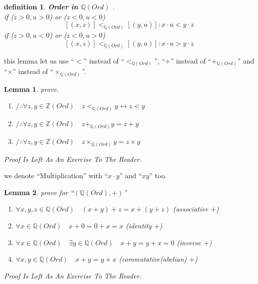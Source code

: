 \documentclass[10pt,a4paper]{book}
\newtheorem{definition}{definition}[section]
\newtheorem{lemma}{Lemma}[section]
\begin{document}
\begin{definition}\textbf{Order in $\mathbb{Q} (Ord)$} .\\
    if ($z > 0 , u > 0$) or ($z < 0 , u < 0$)
    \[ [(x  , z)] <_{\mathbb{Q} (Ord)} [(y  , u)]  : x  \cdot u  < y  \cdot z \]
    if ($z > 0 , u < 0$) or ($z < 0 , u > 0$)
    \[ [(x  , z)] <_{\mathbb{Q} (Ord)} [(y  , u)]  : x  \cdot u  > y  \cdot z \]
\end{definition}

this lemma let us use ``$<$'' instead of ``$<_{\mathbb{Q} (Ord)}$'', ``$+$''
instead of ``$+_{\mathbb{Q} (Ord)}$'' and ``$\times$'' instead of
``$\times_{\mathbb{Q} (Ord)}$''.

\begin{lemma}prove.
    \begin{enumerate}
        \setlength{\itemsep}{0pt} %
        \item       $/ \therefore   \forall z,y \in \mathbb{Z} (Ord) \quad z <_{\mathbb{Q} (Ord)} y  \leftrightarrow z  < y$
        \item       $/ \therefore   \forall z,y \in \mathbb{Z} (Ord) \quad z +_{\mathbb{Q} (Ord)} y  = z  + y$
        \item       $/ \therefore   \forall z,y \in \mathbb{Z} (Ord) \quad z \times_{\mathbb{Q} (Ord)} y  = z  \times y$
    \end{enumerate}
    Proof Is Left As An Exercise To The Reader.
\end{lemma}

we denote ``Multiplication'' with ``$x \cdot y$'' and ``$x y$'' too.

\begin{lemma}prove for  ``$ (\mathbb{Q} (Ord) , +)  $''
    \begin{enumerate}
        \setlength{\itemsep}{0pt} %
        \item       $\forall x ,y ,z  \in \mathbb{Q} (Ord) \quad (x +y )+z  = x +(y +z )  $ (associative $+$)
        \item       $\forall x \in \mathbb{Q} (Ord) \quad x + 0 = 0 + x = x$  (identity  $+$)
        \item       $\forall x \in \mathbb{Q} (Ord) \quad \exists y \in \mathbb{Q} (Ord) \quad x + y = y + x = 0$  (inverse  $+$)
        \item       $\forall x ,y  \in \mathbb{Q} (Ord) \quad x +y  = y +x $  (commutative(abelian)  $+$)
    \end{enumerate}
    Proof Is Left As An Exercise To The Reader.
\end{lemma}
\end{document}
